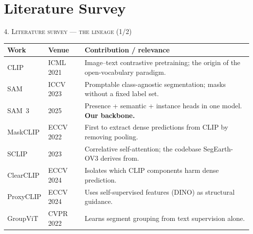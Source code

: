 \documentclass[aspectratio=169]{beamer}
\newcommand{\best}[1]{\textcolor{acc}{\textbf{#1}}}
\begin{document}
\section{Literature Survey}
\begin{frame}{\textsc{4. Literature survey --- the lineage (1/2)}}
\scriptsize
\begin{tabular}{@{}p{2.5cm}p{2.0cm}p{8.4cm}@{}}
\toprule
\textbf{Work} & \textbf{Venue} & \textbf{Contribution / relevance} \\
\midrule
CLIP \cite{clip} & ICML 2021 & Image--text contrastive pretraining; the origin of the open-vocabulary paradigm. \\
SAM \cite{sam} & ICCV 2023 & Promptable class-agnostic segmentation; masks without a fixed label set. \\
SAM~3 \cite{sam3} & 2025 & Presence + semantic + instance heads in one model. \best{Our backbone.} \\
MaskCLIP \cite{maskclip} & ECCV 2022 & First to extract dense predictions from CLIP by removing pooling. \\
SCLIP \cite{sclip} & 2023 & Correlative self-attention; the codebase SegEarth-OV3 derives from. \\
ClearCLIP \cite{clearclip} & ECCV 2024 & Isolates which CLIP components harm dense prediction. \\
ProxyCLIP \cite{proxyclip} & ECCV 2024 & Uses self-supervised features (DINO) as structural guidance. \\
GroupViT \cite{groupvit} & CVPR 2022 & Learns segment grouping from text supervision alone. \\
\bottomrule
\end{tabular}
\end{frame}
\end{document}
